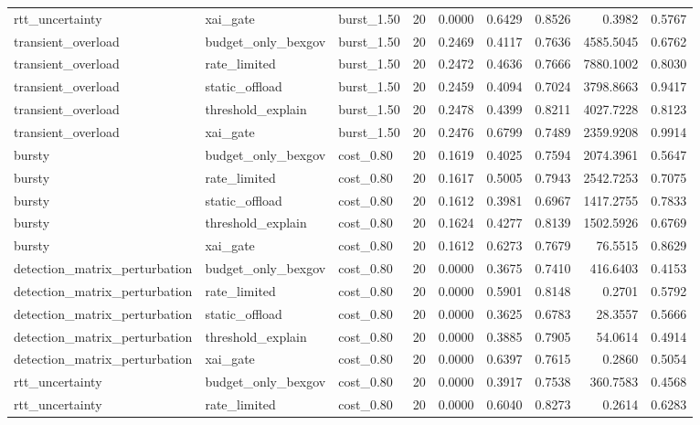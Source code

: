 \begin{table}[t]
\begin{tabular}{lllrrrrrr}
rtt\_uncertainty & xai\_gate & burst\_1.50 & 20 & 0.0000 & 0.6429 & 0.8526 & 0.3982 & 0.5767 \\
transient\_overload & budget\_only\_bexgov & burst\_1.50 & 20 & 0.2469 & 0.4117 & 0.7636 & 4585.5045 & 0.6762 \\
transient\_overload & rate\_limited & burst\_1.50 & 20 & 0.2472 & 0.4636 & 0.7666 & 7880.1002 & 0.8030 \\
transient\_overload & static\_offload & burst\_1.50 & 20 & 0.2459 & 0.4094 & 0.7024 & 3798.8663 & 0.9417 \\
transient\_overload & threshold\_explain & burst\_1.50 & 20 & 0.2478 & 0.4399 & 0.8211 & 4027.7228 & 0.8123 \\
transient\_overload & xai\_gate & burst\_1.50 & 20 & 0.2476 & 0.6799 & 0.7489 & 2359.9208 & 0.9914 \\
bursty & budget\_only\_bexgov & cost\_0.80 & 20 & 0.1619 & 0.4025 & 0.7594 & 2074.3961 & 0.5647 \\
bursty & rate\_limited & cost\_0.80 & 20 & 0.1617 & 0.5005 & 0.7943 & 2542.7253 & 0.7075 \\
bursty & static\_offload & cost\_0.80 & 20 & 0.1612 & 0.3981 & 0.6967 & 1417.2755 & 0.7833 \\
bursty & threshold\_explain & cost\_0.80 & 20 & 0.1624 & 0.4277 & 0.8139 & 1502.5926 & 0.6769 \\
bursty & xai\_gate & cost\_0.80 & 20 & 0.1612 & 0.6273 & 0.7679 & 76.5515 & 0.8629 \\
detection\_matrix\_perturbation & budget\_only\_bexgov & cost\_0.80 & 20 & 0.0000 & 0.3675 & 0.7410 & 416.6403 & 0.4153 \\
detection\_matrix\_perturbation & rate\_limited & cost\_0.80 & 20 & 0.0000 & 0.5901 & 0.8148 & 0.2701 & 0.5792 \\
detection\_matrix\_perturbation & static\_offload & cost\_0.80 & 20 & 0.0000 & 0.3625 & 0.6783 & 28.3557 & 0.5666 \\
detection\_matrix\_perturbation & threshold\_explain & cost\_0.80 & 20 & 0.0000 & 0.3885 & 0.7905 & 54.0614 & 0.4914 \\
detection\_matrix\_perturbation & xai\_gate & cost\_0.80 & 20 & 0.0000 & 0.6397 & 0.7615 & 0.2860 & 0.5054 \\
rtt\_uncertainty & budget\_only\_bexgov & cost\_0.80 & 20 & 0.0000 & 0.3917 & 0.7538 & 360.7583 & 0.4568 \\
rtt\_uncertainty & rate\_limited & cost\_0.80 & 20 & 0.0000 & 0.6040 & 0.8273 & 0.2614 & 0.6283 \\

\end{tabular}
\end{table}
